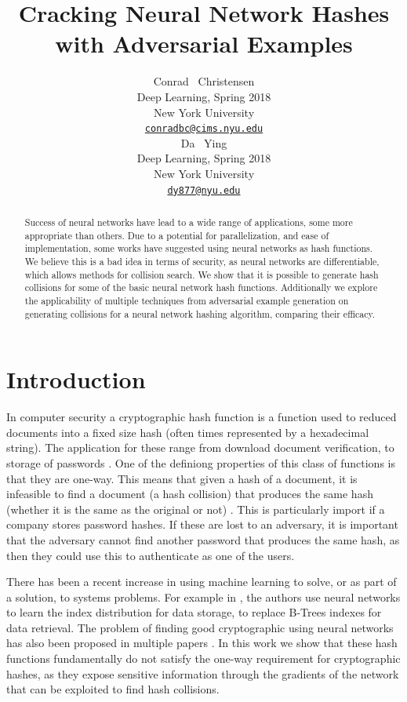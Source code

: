 \documentclass{article}
\title{Cracking Neural Network Hashes with Adversarial Examples}
\author{
  Conrad ~Christensen\\
  Deep Learning, Spring 2018\\
  New York University\\
  \href{mailto:conradbc@cims.nyu.edu}{\texttt{conradbc@cims.nyu.edu}} \\
  \And
  Da ~Ying\\
  Deep Learning, Spring 2018\\
  New York University\\
  \href{mailto:dy877@nyu.edu}{\texttt{dy877@nyu.edu}}
}
\begin{document}

\maketitle

\begin{abstract}
    Success of neural networks have lead to a wide range of applications, some
    more appropriate than others. Due to a potential for parallelization, and
    ease of implementation, some works have suggested using neural networks as
    hash functions.  We believe this is a bad idea in terms of security, as
    neural networks are differentiable, which allows methods for collision
    search. We show that it is possible to generate hash collisions for some of
    the basic neural network hash functions. Additionally we explore the
    applicability of multiple techniques from adversarial example generation on
    generating collisions for a neural network hashing algorithm, comparing
    their efficacy.
\end{abstract}

\section{Introduction}
In computer security a cryptographic hash function is a function used to
reduced documents into a fixed size hash (often times represented by a
hexadecimal string).  The application for these range from download document
verification, to storage of passwords \cite{crypoHash}. One of the definiong
properties of this class of functions is that they are one-way. This means that
given a hash of a document, it is infeasible to find a document (a hash
collision) that produces the same hash (whether it is the same as the original
or not) \cite{crypoHash}.  This is particularly import if a company stores
password hashes. If these are lost to an adversary, it is important that the
adversary cannot find another password that produces the same hash, as then
they could use this to authenticate as one of the users.

There has been a recent increase in using machine learning to solve, or as part
of a solution, to systems problems. For example in \cite{learnedIndex}, the
authors use neural networks to learn the index distribution for data storage,
to replace B-Trees indexes for data retrieval. The problem of finding good
cryptographic using neural networks has also been proposed in multiple papers
\cite{hash1, hash2}. In this work we show that these hash functions
fundamentally do not satisfy the one-way requirement for cryptographic hashes,
as they expose sensitive information through the gradients of the network that
can be exploited to find hash collisions.
\end{document}
